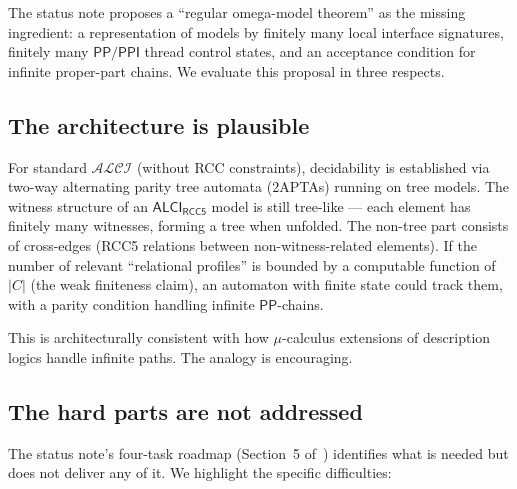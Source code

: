 \documentclass[11pt]{article}
\newcommand{\ALCIRCC}{\mathsf{ALCI}_{\mathsf{RCC5}}}
\newcommand{\ALCI}{\mathcal{ALCI}}
\newcommand{\Pp}{\mathsf{PP}}
\newcommand{\Ppi}{\mathsf{PPI}}
\begin{document}
The status note proposes a ``regular omega-model theorem'' as the
missing ingredient: a representation of models by finitely many
local interface signatures, finitely many $\Pp/\Ppi$ thread control
states, and an acceptance condition for infinite proper-part
chains.  We evaluate this proposal in three respects.

\subsection{The architecture is plausible}

For standard $\ALCI$ (without RCC constraints), decidability is
established via two-way alternating parity tree automata (2APTAs)
running on tree models.  The witness structure of an $\ALCIRCC$
model is still tree-like --- each element has finitely many
witnesses, forming a tree when unfolded.  The non-tree part consists
of cross-edges (RCC5 relations between non-witness-related
elements).  If the number of relevant ``relational profiles'' is
bounded by a computable function of~$|C|$ (the weak finiteness
claim), an automaton with finite state could track them, with a
parity condition handling infinite $\Pp$-chains.

This is architecturally consistent with how $\mu$-calculus
extensions of description logics handle infinite paths.  The analogy
is encouraging.

\subsection{The hard parts are not addressed}

The status note's four-task roadmap (Section~5
of~\cite{GPT2026Status}) identifies what is needed but does not
deliver any of it.  We highlight the specific difficulties:
\end{document}
